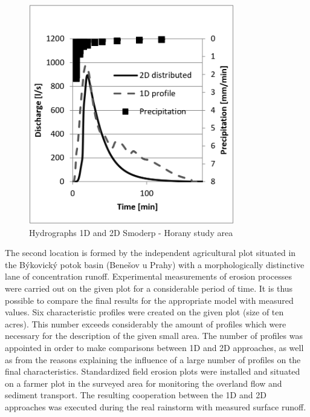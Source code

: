 \begin{figure}[ht!]
\renewcommand{\figurename}{Graf}
\centering
\includegraphics[width=0.8\textwidth]{graph/1D2Dhorany.png}
\caption{Hydrographs 1D and 2D Smoderp - Horany study area}
\label{graf:graf_1}
\end{figure}\FloatBarrier

The second location is formed by the independent agricultural plot situated in the Býkovický potok basin (Benešov u Prahy) with a morphologically distinctive lane of concentration runoff. Experimental measurements of erosion processes were carried out on the given plot for a considerable period of time. It is thus possible to compare the final results for the appropriate model with measured values. Six characteristic profiles were created on the given plot (size of ten acres). This number exceeds considerably the amount of profiles which were necessary for the description of the given small area. The number of profiles was appointed in order to make comparisons between 1D and 2D approaches, as well as from the reasons explaining the influence of a large number of profiles on the final characteristics. Standardized field erosion plots were installed and situated on a farmer plot in the surveyed area for monitoring the overland flow and sediment transport. The resulting cooperation between the 1D and 2D approaches was executed during the real rainstorm with measured surface runoff.

